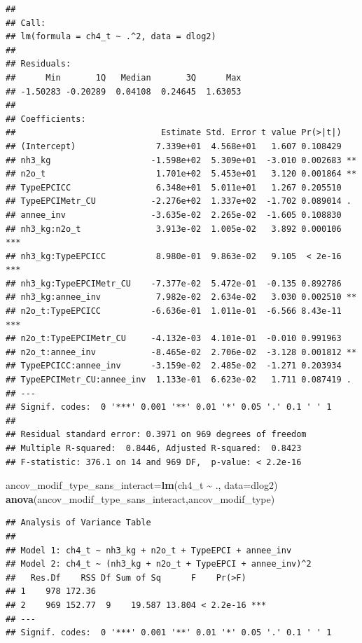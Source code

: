 \documentclass[
]{article}
\newenvironment{Shaded}{\begin{snugshade}}{\end{snugshade}}
\newcommand{\AttributeTok}[1]{\textcolor[rgb]{0.13,0.29,0.53}{#1}}
\newcommand{\FunctionTok}[1]{\textcolor[rgb]{0.13,0.29,0.53}{\textbf{#1}}}
\newcommand{\NormalTok}[1]{#1}
\newcommand{\OtherTok}[1]{\textcolor[rgb]{0.56,0.35,0.01}{#1}}
\newcommand{\SpecialCharTok}[1]{\textcolor[rgb]{0.81,0.36,0.00}{\textbf{#1}}}
\begin{document}
\begin{verbatim}
## 
## Call:
## lm(formula = ch4_t ~ .^2, data = dlog2)
## 
## Residuals:
##      Min       1Q   Median       3Q      Max 
## -1.50283 -0.20289  0.04108  0.24645  1.63053 
## 
## Coefficients:
##                             Estimate Std. Error t value Pr(>|t|)    
## (Intercept)                7.339e+01  4.568e+01   1.607 0.108429    
## nh3_kg                    -1.598e+02  5.309e+01  -3.010 0.002683 ** 
## n2o_t                      1.701e+02  5.453e+01   3.120 0.001864 ** 
## TypeEPCICC                 6.348e+01  5.011e+01   1.267 0.205510    
## TypeEPCIMetr_CU           -2.276e+02  1.337e+02  -1.702 0.089014 .  
## annee_inv                 -3.635e-02  2.265e-02  -1.605 0.108830    
## nh3_kg:n2o_t               3.913e-02  1.005e-02   3.892 0.000106 ***
## nh3_kg:TypeEPCICC          8.980e-01  9.863e-02   9.105  < 2e-16 ***
## nh3_kg:TypeEPCIMetr_CU    -7.377e-02  5.472e-01  -0.135 0.892786    
## nh3_kg:annee_inv           7.982e-02  2.634e-02   3.030 0.002510 ** 
## n2o_t:TypeEPCICC          -6.636e-01  1.011e-01  -6.566 8.43e-11 ***
## n2o_t:TypeEPCIMetr_CU     -4.132e-03  4.101e-01  -0.010 0.991963    
## n2o_t:annee_inv           -8.465e-02  2.706e-02  -3.128 0.001812 ** 
## TypeEPCICC:annee_inv      -3.159e-02  2.485e-02  -1.271 0.203934    
## TypeEPCIMetr_CU:annee_inv  1.133e-01  6.623e-02   1.711 0.087419 .  
## ---
## Signif. codes:  0 '***' 0.001 '**' 0.01 '*' 0.05 '.' 0.1 ' ' 1
## 
## Residual standard error: 0.3971 on 969 degrees of freedom
## Multiple R-squared:  0.8446, Adjusted R-squared:  0.8423 
## F-statistic: 376.1 on 14 and 969 DF,  p-value: < 2.2e-16
\end{verbatim}

\begin{Shaded}
\begin{Highlighting}[]
\NormalTok{ancov\_modif\_type\_sans\_interact}\OtherTok{=}\FunctionTok{lm}\NormalTok{(ch4\_t }\SpecialCharTok{\textasciitilde{}}\NormalTok{ ., }\AttributeTok{data=}\NormalTok{dlog2)}
\FunctionTok{anova}\NormalTok{(ancov\_modif\_type\_sans\_interact,ancov\_modif\_type)}
\end{Highlighting}
\end{Shaded}

\begin{verbatim}
## Analysis of Variance Table
## 
## Model 1: ch4_t ~ nh3_kg + n2o_t + TypeEPCI + annee_inv
## Model 2: ch4_t ~ (nh3_kg + n2o_t + TypeEPCI + annee_inv)^2
##   Res.Df    RSS Df Sum of Sq      F    Pr(>F)    
## 1    978 172.36                                  
## 2    969 152.77  9    19.587 13.804 < 2.2e-16 ***
## ---
## Signif. codes:  0 '***' 0.001 '**' 0.01 '*' 0.05 '.' 0.1 ' ' 1
\end{verbatim}
\end{document}

